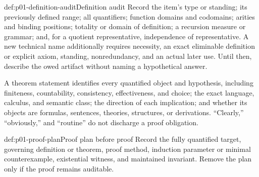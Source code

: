 \begin{hbmethod}{def:p01-definition-audit}{Definition audit}
Record the item's type or standing; its previously defined range; all
quantifiers; function domains and codomains; arities and binding positions;
totality or domain of definition; a recursion measure or grammar; and, for a
quotient representative, independence of representative.  A new technical
name additionally requires necessity, an exact eliminable definition or
explicit axiom, standing, nonredundancy, and an actual later use.  Until then,
describe the owed artifact without naming a hypothetical answer.
\end{hbmethod}

A theorem statement identifies every quantified object and hypothesis,
including finiteness, countability, consistency, effectiveness, and choice;
the exact language, calculus, and semantic class; the direction of each
implication; and whether its objects are formulas, sentences, theories,
structures, or derivations.  ``Clearly,'' ``obviously,'' and ``routine'' do
not discharge a proof obligation.

\begin{hbmethod}{def:p01-proof-plan}{Proof plan before proof}
Record the fully quantified target, governing definition or theorem, proof
method, induction parameter or minimal counterexample, existential witness,
and maintained invariant.  Remove the plan only if the proof remains
auditable.
\end{hbmethod}

